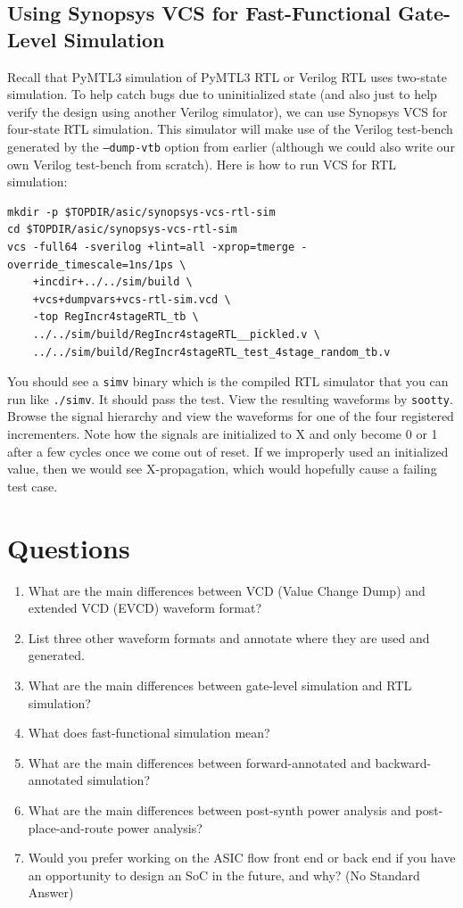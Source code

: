 \documentclass[a4paper,12pt,twoside]{article}
\begin{document}
\subsection{Using Synopsys VCS for Fast-Functional Gate-Level Simulation}\label{SPyMTL4}
Recall that PyMTL3 simulation of PyMTL3 RTL or Verilog RTL uses two-state simulation. To help catch bugs due to uninitialized state (and also just to help verify the design using another Verilog simulator), we can use Synopsys VCS for four-state RTL simulation. This simulator will make use of the Verilog test-bench generated by the \texttt{--dump-vtb} option from earlier (although we could also write our own Verilog test-bench from scratch). Here is how to run VCS for RTL simulation:
\begin{verbatim}
mkdir -p $TOPDIR/asic/synopsys-vcs-rtl-sim
cd $TOPDIR/asic/synopsys-vcs-rtl-sim
vcs -full64 -sverilog +lint=all -xprop=tmerge -override_timescale=1ns/1ps \
    +incdir+../../sim/build \
    +vcs+dumpvars+vcs-rtl-sim.vcd \
    -top RegIncr4stageRTL_tb \
    ../../sim/build/RegIncr4stageRTL__pickled.v \
    ../../sim/build/RegIncr4stageRTL_test_4stage_random_tb.v
\end{verbatim}
You should see a \texttt{simv} binary which is the compiled RTL simulator that you can run like \texttt{./simv}. It should pass the test. View the resulting waveforms by \texttt{sootty}. Browse the signal hierarchy and view the waveforms for one of the four registered incrementers. Note how the signals are initialized to X and only become 0 or 1 after a few cycles once we come out of reset. If we improperly used an initialized value, then we would see X-propagation, which would hopefully cause a failing test case.
\section{Questions}\label{SQ}
\begin{enumerate}
    \item What are the main differences between VCD (Value Change Dump) and extended VCD (EVCD) waveform format?
    \item List three other waveform formats and annotate where they are used and generated.
    \item What are the main differences between gate-level simulation and RTL simulation?
    \item What does fast-functional simulation mean?
    \item What are the main differences between forward-annotated and backward-annotated simulation?
    \item What are the main differences between post-synth power analysis and post-place-and-route power analysis?
    \item Would you prefer working on the ASIC flow front end or back end if you have an opportunity to design an SoC in the future, and why? (No Standard Answer)
\end{enumerate}
\end{document}

